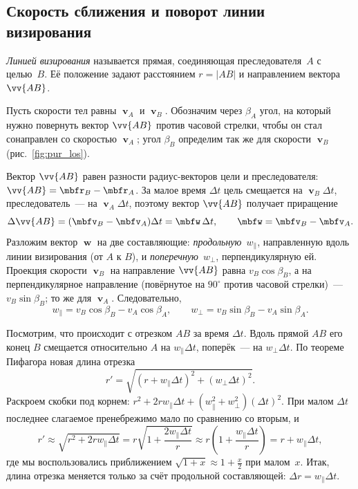 \documentclass[../main.tex]{subfiles}
\begin{document}
\subsection{Скорость сближения и поворот линии визирования}

\begin{definition}
\textit{Линией визирования} называется прямая, соединяющая преследователя~$A$ с
целью~$B$. Её положение задают расстоянием $r = |AB|$ и направлением вектора
$\vv{AB}$.
\end{definition}

Пусть скорости тел равны $\mbfv_A$ и $\mbfv_B$. Обозначим через $\beta_A$ угол, на
который нужно повернуть вектор $\vv{AB}$ против часовой стрелки, чтобы он стал
сонаправлен со скоростью $\mbfv_A$; угол $\beta_B$ определим так же для скорости
$\mbfv_B$ (рис.~\ref{fig:pur_los}).


Вектор $\vv{AB}$ равен разности радиус-векторов цели и преследователя:
$\vv{AB} = \mbfr_B - \mbfr_A$. За малое время $\Delta t$ цель смещается на
$\mbfv_B\Delta t$, преследователь~--- на $\mbfv_A\Delta t$, поэтому вектор $\vv{AB}$
получает приращение
\[
\Delta\vv{AB} = (\mbfv_B - \mbfv_A)\Delta t = \mbfw\,\Delta t,
\qquad
\mbfw = \mbfv_B - \mbfv_A.
\]
Разложим вектор $\mbfw$ на две составляющие: \textit{продольную}~$w_\parallel$,
направленную вдоль линии визирования (от $A$ к $B$), и \textit{поперечную}~$w_\perp$,
перпендикулярную ей. Проекция скорости $\mbfv_B$ на направление $\vv{AB}$ равна
$v_B\cos\beta_B$, а на перпендикулярное направление (повёрнутое на $90^\circ$ против
часовой стрелки)~--- $v_B\sin\beta_B$; то же для $\mbfv_A$. Следовательно,
\[
w_\parallel = v_B\cos\beta_B - v_A\cos\beta_A,
\qquad
w_\perp = v_B\sin\beta_B - v_A\sin\beta_A.
\]

Посмотрим, что происходит с отрезком $AB$ за время $\Delta t$. Вдоль прямой $AB$ его
конец $B$ смещается относительно $A$ на $w_\parallel\Delta t$, поперёк~--- на
$w_\perp\Delta t$. По теореме Пифагора новая длина отрезка
\[
r' = \sqrt{(r + w_\parallel\Delta t)^2 + (w_\perp\Delta t)^2}.
\]
Раскроем скобки под корнем: $r^2 + 2rw_\parallel\Delta t + (w_\parallel^2 +
w_\perp^2)(\Delta t)^2$. При малом $\Delta t$ последнее слагаемое пренебрежимо мало
по сравнению со вторым, и
\[
r' \approx \sqrt{r^2 + 2rw_\parallel\Delta t}
= r\sqrt{1 + \frac{2w_\parallel\Delta t}{r}}
\approx r\left(1 + \frac{w_\parallel\Delta t}{r}\right)
= r + w_\parallel\Delta t,
\]
где мы воспользовались приближением $\sqrt{1 + x} \approx 1 + \frac{x}{2}$ при
малом~$x$. Итак, длина отрезка меняется только за счёт продольной составляющей:
$\Delta r = w_\parallel\Delta t$.
\end{document}
